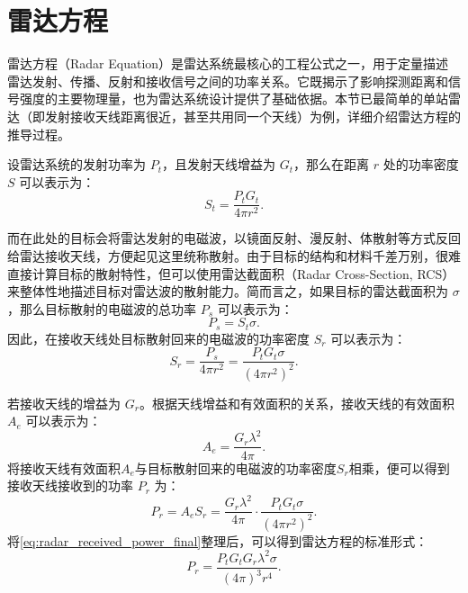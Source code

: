 \section{雷达方程}
雷达方程（Radar Equation）是雷达系统最核心的工程公式之一，用于定量描述雷达发射、传播、反射和接收信号之间的功率关系。它既揭示了影响探测距离和信号强度的主要物理量，也为雷达系统设计提供了基础依据。本节已最简单的单站雷达（即发射接收天线距离很近，甚至共用同一个天线）为例，详细介绍雷达方程的推导过程。

设雷达系统的发射功率为 $P_t$，且发射天线增益为 $G_t$，那么在距离 $r$ 处的功率密度 $S$ 可以表示为：
\begin{equation*}
    S_t = \frac{P_t G_t}{4 \pi r^2}.
    \label{eq:radar_power_density}
\end{equation*}

而在此处的目标会将雷达发射的电磁波，以镜面反射、漫反射、体散射等方式反回给雷达接收天线，方便起见这里统称散射。由于目标的结构和材料千差万别，很难直接计算目标的散射特性，但可以使用雷达截面积（Radar Cross-Section, RCS）来整体性地描述目标对雷达波的散射能力。简而言之，如果目标的雷达截面积为 $\sigma$，那么目标散射的电磁波的总功率 $P_s$ 可以表示为：
\begin{equation*}
    P_s = S_t \sigma.
    \label{eq:radar_received_power}
\end{equation*}
因此，在接收天线处目标散射回来的电磁波的功率密度 $S_r$ 可以表示为：
\begin{equation*}
    S_r = \frac{P_s}{4 \pi r^2} = \frac{P_t G_t \sigma}{(4 \pi r^2)^2}.
    \label{eq:radar_received_power_density}
\end{equation*}

若接收天线的增益为 $G_r$。根据天线增益和有效面积的关系，接收天线的有效面积 $A_e$ 可以表示为：
\begin{equation}
    A_e = \frac{G_r \lambda^2}{4 \pi}.
    \label{eq:radar_effective_area}
\end{equation}
将接收天线有效面积\( A_e \)与目标散射回来的电磁波的功率密度\( S_r \)相乘，便可以得到接收天线接收到的功率 $P_r$ 为：
\begin{equation*}
    P_r = A_e S_r  = \frac{G_r \lambda^2}{4 \pi} \cdot \frac{P_t G_t \sigma}{(4 \pi r^2)^2}.
    \label{eq:radar_received_power_final}
\end{equation*}
将\cref{eq:radar_received_power_final}整理后，可以得到雷达方程的标准形式：
\begin{equation}
    P_r = \frac{P_t G_t G_r \lambda^2 \sigma}{(4 \pi)^3 r^4}.
    \label{eq:radar_equation}
\end{equation}

